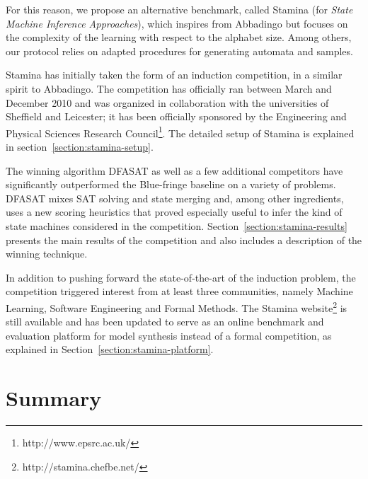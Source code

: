 For this reason, we propose an alternative benchmark, called Stamina (for \emph{State Machine Inference Approaches}), which inspires from Abbadingo but focuses on the complexity of the learning with respect to the alphabet size. Among others, our protocol relies on adapted procedures for generating automata and samples. 

Stamina has initially taken the form of an induction competition, in a similar spirit to Abbadingo. The competition has officially ran between March and December 2010 and was organized in collaboration with the universities of Sheffield and Leicester; it has been officially sponsored by the Engineering and Physical Sciences Research Council\footnote{http://www.epsrc.ac.uk/}. The detailed setup of Stamina is explained in section~\ref{section:stamina-setup}. 

The winning algorithm DFASAT as well as a few additional competitors have significantly outperformed the Blue-fringe baseline on a variety of problems. DFASAT mixes SAT solving and state merging and, among other ingredients, uses a new scoring heuristics that proved especially useful to infer the kind of state machines considered in the competition. Section~\ref{section:stamina-results} presents the main results of the competition and also includes a description of the winning technique. 

In addition to pushing forward the state-of-the-art of the induction problem, the competition triggered interest from at least three communities, namely Machine Learning, Software Engineering and Formal Methods. The Stamina website\footnote{http://stamina.chefbe.net/} is still available and has been updated to serve as an online benchmark and evaluation platform for model synthesis instead of a formal competition, as explained in Section~\ref{section:stamina-platform}.






\section*{Summary}

